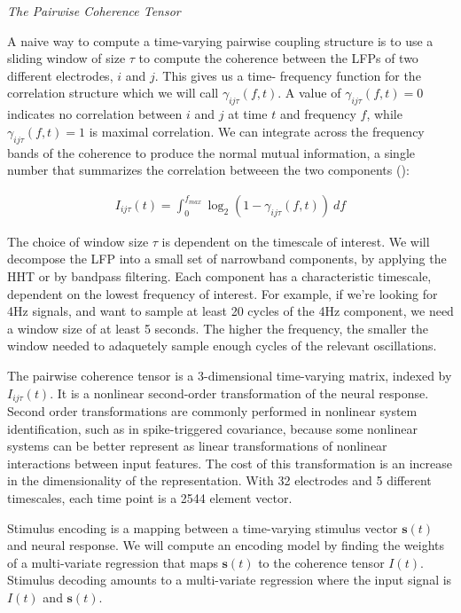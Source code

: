 \documentclass[12pt,article,oneside]{memoir}
\begin{document}
\bigskip

\noindent \textit{The Pairwise Coherence Tensor}

A naive way to compute a time-varying pairwise coupling structure is to use a sliding window of size $\tau$
to compute the coherence between the LFPs of two different electrodes, $i$ and $j$. This gives us a time-
frequency function for the correlation structure which we will call $\gamma_{ij\tau} (f, t)$. A value of
$\gamma_{ij\tau} (f, t)=0$ indicates no correlation between $i$ and $j$ at time $t$ and frequency $f$, while
$\gamma_{ij\tau} (f, t)=1$ is maximal correlation. We can integrate across the frequency bands of the coherence
to produce the normal mutual information, a single number that summarizes the correlation betweeen the two
components (\cite{Hsu2004}):

\begin{align}
I_{ij\tau} (t) = \int_{0}^{f_{max}} \log_2 \left( 1 - \gamma_{ij\tau} (f, t) \right) ~ df
\end{align}
	
The choice of window size $\tau$ is dependent on the timescale of interest. We will decompose the LFP into
a small set of narrowband components, by applying the HHT or by bandpass filtering. Each component has a
characteristic timescale, dependent on the lowest frequency of interest. For example, if
we're looking for 4Hz signals, and want to sample at least 20 cycles of the 4Hz component, we need a window
size of at least 5 seconds. The higher the frequency, the smaller the window needed to adaquetely sample
enough cycles of the relevant oscillations.

The pairwise coherence tensor is a 3-dimensional time-varying matrix, indexed by $I_{ij\tau}(t)$.  
It is a nonlinear second-order transformation of the neural response. Second order transformations are commonly
performed in nonlinear system identification, such as in spike-triggered covariance, because some
nonlinear systems can be better represent as linear transformations of nonlinear interactions between
input features. The cost of this transformation is an increase in the dimensionality of the
representation. With 32 electrodes and 5 different timescales, each time point is a 2544 element
vector.

Stimulus encoding is a mapping between a time-varying stimulus vector $\bm{s}(t)$ and neural response.
We will compute an encoding model by finding the weights of a multi-variate regression that maps $\bm{s}(t)$
to the coherence tensor $I(t)$. Stimulus decoding amounts to a multi-variate regression where the
input signal is $I(t)$ and $\bm{s}(t)$.
\end{document}
